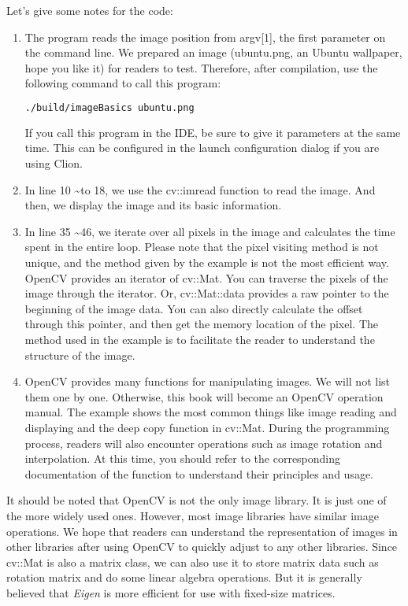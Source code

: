 Let's give some notes for the code:
\begin{enumerate}
\item The program reads the image position from argv[1], the first parameter on the command line. We prepared an image (ubuntu.png, an Ubuntu wallpaper, hope you like it) for readers to test. Therefore, after compilation, use the following command to call this program:
\begin{lstlisting}[language=sh, caption=Terminal input:]
./build/imageBasics ubuntu.png
\end{lstlisting}
If you call this program in the IDE, be sure to give it parameters at the same time. This can be configured in the launch configuration dialog if you are using Clion.
\item In line 10 \textasciitilde to 18, we use the cv::imread function to read the image. And then, we display the image and its basic information.
\item In line 35 \textasciitilde 46, we iterate over all pixels in the image and calculates the time spent in the entire loop. Please note that the pixel visiting method is not unique, and the method given by the example is not the most efficient way. OpenCV provides an iterator of cv::Mat. You can traverse the pixels of the image through the iterator. Or, cv::Mat::data provides a raw pointer to the beginning of the image data. You can also directly calculate the offset through this pointer, and then get the memory location of the pixel. The method used in the example is to facilitate the reader to understand the structure of the image.

\item OpenCV provides many functions for manipulating images. We will not list them one by one. Otherwise, this book will become an OpenCV operation manual. The example shows the most common things like image reading and displaying and the deep copy function in cv::Mat. During the programming process, readers will also encounter operations such as image rotation and interpolation. At this time, you should refer to the corresponding documentation of the function to understand their principles and usage.
\end{enumerate}

It should be noted that OpenCV is not the only image library. It is just one of the more widely used ones. However, most image libraries have similar image operations. We hope that readers can understand the representation of images in other libraries after using OpenCV to quickly adjust to any other libraries. Since cv::Mat is also a matrix class, we can also use it to store matrix data such as rotation matrix and do some linear algebra operations. But it is generally believed that \textit{Eigen} is more efficient for use with fixed-size matrices.

